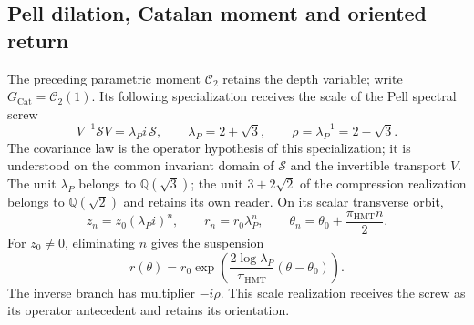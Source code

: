 \subsection{Pell dilation, Catalan moment and oriented return}
\label{corpus9:iv:pell}

The preceding parametric moment \(\mathcal C_2\) retains the
depth variable; write
\(G_{\mathrm{Cat}}=\mathcal C_2(1)\).
Its following specialization receives
the scale of the Pell spectral screw
\[
 V^{-1}\mathscr S V=\lambda_P i\,\mathscr S,\qquad
 \lambda_P=2+\sqrt3,\qquad \rho=\lambda_P^{-1}=2-\sqrt3.
\]
The covariance law is the operator hypothesis of this
specialization; it is understood on the common invariant
domain of \(\mathscr S\) and the invertible transport \(V\).
The unit \(\lambda_P\) belongs to \(\mathbb Q(\sqrt3)\);
the unit \(3+2\sqrt2\) of the compression realization
belongs to \(\mathbb Q(\sqrt2)\) and retains its own reader.
On its scalar transverse orbit,
\[
 z_n=z_0(\lambda_P i)^n,\qquad
 r_n=r_0\lambda_P^n,\qquad
 \theta_n=\theta_0+\frac{\pi_{\mathrm{HMT}}n}{2}.
\]
For \(z_0\ne0\), eliminating \(n\) gives the suspension
\[
 r(\theta)=r_0\exp\!\left(
   \frac{2\log\lambda_P}{\pi_{\mathrm{HMT}}}
   (\theta-\theta_0)\right).
\]
The inverse branch has multiplier \(-i\rho\). This
scale realization receives the screw as its operator
antecedent and retains its orientation.

